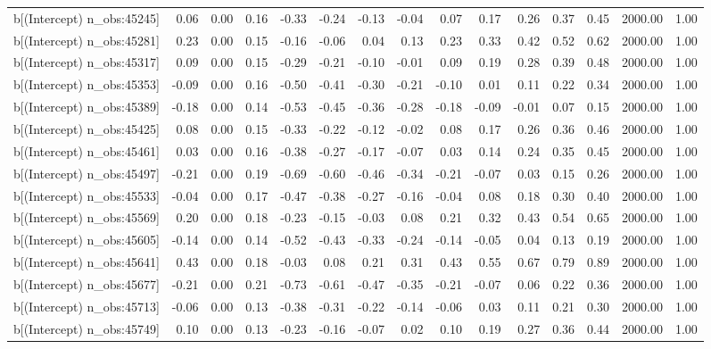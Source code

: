 \begin{table}[ht]
\begin{tabular}{rrrrrrrrrrrrrrr}
  b[(Intercept) n\_obs:45245] & 0.06 & 0.00 & 0.16 & -0.33 & -0.24 & -0.13 & -0.04 & 0.07 & 0.17 & 0.26 & 0.37 & 0.45 & 2000.00 & 1.00 \\ 
  b[(Intercept) n\_obs:45281] & 0.23 & 0.00 & 0.15 & -0.16 & -0.06 & 0.04 & 0.13 & 0.23 & 0.33 & 0.42 & 0.52 & 0.62 & 2000.00 & 1.00 \\ 
  b[(Intercept) n\_obs:45317] & 0.09 & 0.00 & 0.15 & -0.29 & -0.21 & -0.10 & -0.01 & 0.09 & 0.19 & 0.28 & 0.39 & 0.48 & 2000.00 & 1.00 \\ 
  b[(Intercept) n\_obs:45353] & -0.09 & 0.00 & 0.16 & -0.50 & -0.41 & -0.30 & -0.21 & -0.10 & 0.01 & 0.11 & 0.22 & 0.34 & 2000.00 & 1.00 \\ 
  b[(Intercept) n\_obs:45389] & -0.18 & 0.00 & 0.14 & -0.53 & -0.45 & -0.36 & -0.28 & -0.18 & -0.09 & -0.01 & 0.07 & 0.15 & 2000.00 & 1.00 \\ 
  b[(Intercept) n\_obs:45425] & 0.08 & 0.00 & 0.15 & -0.33 & -0.22 & -0.12 & -0.02 & 0.08 & 0.17 & 0.26 & 0.36 & 0.46 & 2000.00 & 1.00 \\ 
  b[(Intercept) n\_obs:45461] & 0.03 & 0.00 & 0.16 & -0.38 & -0.27 & -0.17 & -0.07 & 0.03 & 0.14 & 0.24 & 0.35 & 0.45 & 2000.00 & 1.00 \\ 
  b[(Intercept) n\_obs:45497] & -0.21 & 0.00 & 0.19 & -0.69 & -0.60 & -0.46 & -0.34 & -0.21 & -0.07 & 0.03 & 0.15 & 0.26 & 2000.00 & 1.00 \\ 
  b[(Intercept) n\_obs:45533] & -0.04 & 0.00 & 0.17 & -0.47 & -0.38 & -0.27 & -0.16 & -0.04 & 0.08 & 0.18 & 0.30 & 0.40 & 2000.00 & 1.00 \\ 
  b[(Intercept) n\_obs:45569] & 0.20 & 0.00 & 0.18 & -0.23 & -0.15 & -0.03 & 0.08 & 0.21 & 0.32 & 0.43 & 0.54 & 0.65 & 2000.00 & 1.00 \\ 
  b[(Intercept) n\_obs:45605] & -0.14 & 0.00 & 0.14 & -0.52 & -0.43 & -0.33 & -0.24 & -0.14 & -0.05 & 0.04 & 0.13 & 0.19 & 2000.00 & 1.00 \\ 
  b[(Intercept) n\_obs:45641] & 0.43 & 0.00 & 0.18 & -0.03 & 0.08 & 0.21 & 0.31 & 0.43 & 0.55 & 0.67 & 0.79 & 0.89 & 2000.00 & 1.00 \\ 
  b[(Intercept) n\_obs:45677] & -0.21 & 0.00 & 0.21 & -0.73 & -0.61 & -0.47 & -0.35 & -0.21 & -0.07 & 0.06 & 0.22 & 0.36 & 2000.00 & 1.00 \\ 
  b[(Intercept) n\_obs:45713] & -0.06 & 0.00 & 0.13 & -0.38 & -0.31 & -0.22 & -0.14 & -0.06 & 0.03 & 0.11 & 0.21 & 0.30 & 2000.00 & 1.00 \\ 
  b[(Intercept) n\_obs:45749] & 0.10 & 0.00 & 0.13 & -0.23 & -0.16 & -0.07 & 0.02 & 0.10 & 0.19 & 0.27 & 0.36 & 0.44 & 2000.00 & 1.00 \\ 

\end{tabular}
\end{table}

